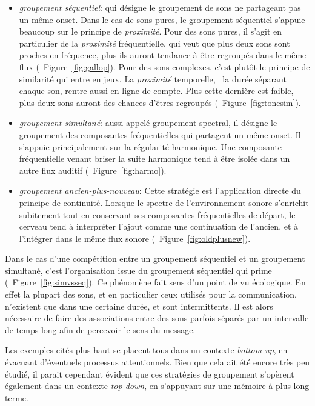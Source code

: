 \begin{itemize}
\item \emph{groupement séquentiel}: qui désigne le groupement de sons ne partageant pas un même onset. Dans le cas de sons pures, le groupement séquentiel s'appuie beaucoup sur le principe de \emph{proximité}. Pour des sons pures, il s'agit en particulier de la \emph{proximité} fréquentielle, qui veut que plus deux sons sont proches en fréquence, plus ils auront tendance à être regroupés dans le même flux (\Cf~Figure~\ref{fig:gallop}). Pour des sons complexes, c'est plutôt le principe de similarité qui entre en jeux. La \emph{proximité} temporelle, \ie~la durée séparant chaque son, rentre aussi en ligne de compte. Plus cette dernière est faible, plus deux sons auront des chances d'êtres regroupés (\Cf~Figure~\ref{fig:tonesim}).
\item \emph{groupement simultané}: aussi appelé groupement spectral, il désigne le groupement des composantes fréquentielles qui partagent un même onset. Il s'appuie principalement sur la régularité harmonique. Une composante fréquentielle venant briser la suite harmonique tend à être isolée dans un autre flux auditif (\Cf~Figure~\ref{fig:harmo}).
\item \emph{groupement ancien-plus-nouveau}: Cette stratégie est l'application directe du principe de continuité. Lorsque le spectre de l'environnement sonore s’enrichit subitement tout en conservant ses composantes fréquentielles de départ, le cerveau tend à interpréter l'ajout comme une continuation de l'ancien, et à l'intégrer dans le même flux sonore (\Cf~Figure~\ref{fig:oldplusnew}).
\end{itemize}

Dans le cas d'une compétition entre un groupement séquentiel et un groupement simultané, c'est l'organisation issue du groupement séquentiel qui prime (\Cf~Figure~\ref{fig:simvsseq}). Ce phénomène fait sens d'un point de vu écologique. En effet la plupart des sons, et en particulier ceux utilisés pour la communication, n'existent que dans une certaine durée, et sont intermittents. Il est alors nécessaire de faire des associations entre des sons parfois séparés par un intervalle de temps long afin de percevoir le sens du message. \citep{winkler2009modeling}

Les exemples cités plus haut se placent tous dans un contexte \emph{bottom-up}, en évacuant d'éventuels processus attentionnels. Bien que cela ait été encore très peu étudié, il parait cependant évident que ces stratégies de groupement s’opèrent également  dans un contexte \emph{top-down}, en s'appuyant sur une mémoire à plus long terme.

